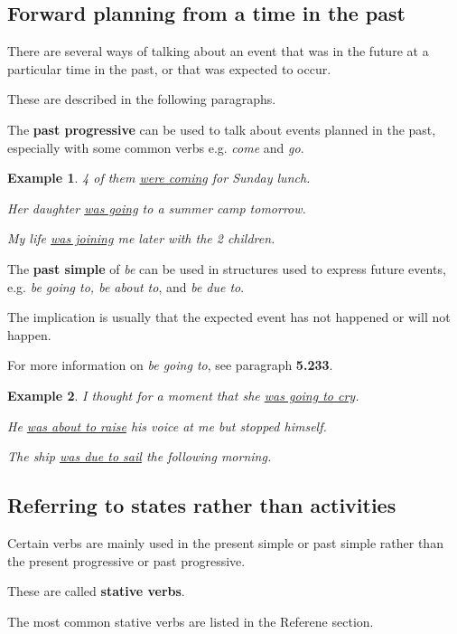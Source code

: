 \documentclass[oneside]{book}
\numberwithin{equation}{section}
\newtheorem{example}{Example}[section]
\begin{document}
\subsection{Forward planning from a time in the past}
\noindent{} There are several ways of talking about an event that was in the future at a particular time in the past, or that was expected to occur.

These are described in the following paragraphs.

%
\noindent{} The \textbf{past progressive} can be used to talk about events planned in the past, especially with some common verbs e.g. \textit{come} and \textit{go}.
\begin{example}
    4 of them \underline{were coming} for Sunday lunch.
    
    Her daughter \underline{was going} to a summer camp tomorrow.
    
    My life \underline{was joining} me later with the 2 children.
\end{example}
%
\noindent{} The \textbf{past simple} of \textit{be} can be used in structures used to express future events, e.g. \textit{be going to, be about to}, and \textit{be due to}.

The implication is usually that the expected event has not happened or will not happen.

For more information on \textit{be going to}, see paragraph \textbf{5.233}.
\begin{example}
    I thought for a moment that she \underline{was going to cry}.
    
    He \underline{was about to raise} his voice at me but stopped himself.
    
    The ship \underline{was due to sail} the following morning.
\end{example}

\subsection{Referring to states rather than activities}
\noindent{} Certain verbs are mainly used in the present simple or past simple rather than the present progressive or past progressive.

These are called \textbf{stative verbs}.

The most common stative verbs are listed in the Referene section.
\end{document}
